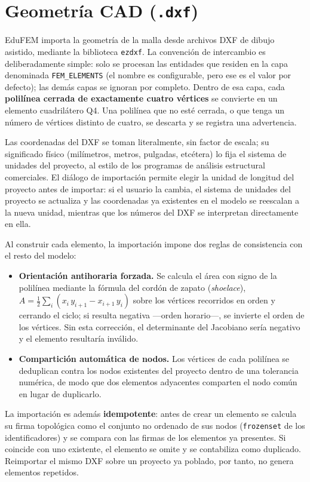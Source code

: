 \section{Geometría CAD (\texttt{.dxf})}

EduFEM importa la geometría de la malla desde archivos DXF de dibujo asistido, mediante la biblioteca \texttt{ezdxf}. La convención de intercambio es deliberadamente simple: solo se procesan las entidades que residen en la capa denominada \texttt{FEM\_ELEMENTS} (el nombre es configurable, pero ese es el valor por defecto); las demás capas se ignoran por completo. Dentro de esa capa, cada \textbf{polilínea cerrada de exactamente cuatro vértices} se convierte en un elemento cuadrilátero Q4. Una polilínea que no esté cerrada, o que tenga un número de vértices distinto de cuatro, se descarta y se registra una advertencia.

Las coordenadas del DXF se toman literalmente, sin factor de escala; su significado físico (milímetros, metros, pulgadas, etcétera) lo fija el sistema de unidades del proyecto, al estilo de los programas de análisis estructural comerciales. El diálogo de importación permite elegir la unidad de longitud del proyecto antes de importar: si el usuario la cambia, el sistema de unidades del proyecto se actualiza y las coordenadas ya existentes en el modelo se reescalan a la nueva unidad, mientras que los números del DXF se interpretan directamente en ella.

Al construir cada elemento, la importación impone dos reglas de consistencia con el resto del modelo:

\begin{itemize}
  \item \textbf{Orientación antihoraria forzada.} Se calcula el área con signo de la polilínea mediante la fórmula del cordón de zapato (\emph{shoelace}), $A = \tfrac{1}{2}\sum_i (x_i\,y_{i+1} - x_{i+1}\,y_i)$ sobre los vértices recorridos en orden y cerrando el ciclo; si resulta negativa ---orden horario---, se invierte el orden de los vértices. Sin esta corrección, el determinante del Jacobiano sería negativo y el elemento resultaría inválido.
  \item \textbf{Compartición automática de nodos.} Los vértices de cada polilínea se deduplican contra los nodos existentes del proyecto dentro de una tolerancia numérica, de modo que dos elementos adyacentes comparten el nodo común en lugar de duplicarlo.
\end{itemize}

La importación es además \textbf{idempotente}: antes de crear un elemento se calcula su firma topológica como el conjunto no ordenado de sus nodos (\texttt{frozenset} de los identificadores) y se compara con las firmas de los elementos ya presentes. Si coincide con uno existente, el elemento se omite y se contabiliza como duplicado. Reimportar el mismo DXF sobre un proyecto ya poblado, por tanto, no genera elementos repetidos.

